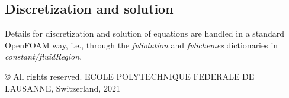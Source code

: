 \subsection*{Discretization and solution}

Details for discretization and solution of equations are handled in a standard Open\+F\+O\+AM way, i.\+e., through the {\itshape fv\+Solution} and {\itshape fv\+Schemes} dictionaries in {\itshape constant/fluid\+Region}.

© All rights reserved. E\+C\+O\+LE P\+O\+L\+Y\+T\+E\+C\+H\+N\+I\+Q\+UE F\+E\+D\+E\+R\+A\+LE DE L\+A\+U\+S\+A\+N\+NE, Switzerland, 2021 